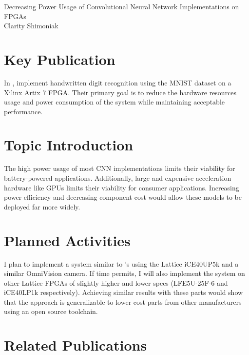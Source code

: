 \documentclass[12pt,letterpaper,english]{article}
\begin{document}
\begin{center}
	{\LARGE%
		Decreasing Power Usage of
		Convolutional Neural Network Implementations
		on FPGAs
	} \\
	\vspace{6pt}
	Clarity Shimoniak
	\vspace{-18pt}
\end{center}

\section*{Key Publication}

In \autocite{main}, \citeauthor{main} implement handwritten
digit recognition using the MNIST dataset on a Xilinx Artix 7 FPGA. Their
primary goal is to reduce the hardware resources usage and power consumption of
the system while maintaining acceptable performance.


\section*{Topic Introduction}

The high power usage of most CNN implementations limits their viability for
battery-powered applications. Additionally, large and expensive acceleration
hardware like GPUs limits their viability for consumer applications. Increasing
power efficiency and decreasing component cost would allow these models to be
deployed far more widely.


\section*{Planned Activities}

I plan to implement a system similar to \citeauthor*{main}'s using the Lattice
iCE40UP5k and a similar OmniVision camera. If time permits, I will also
implement the system on other Lattice FPGAs of slightly higher and lower specs
(LFE5U-25F-6 and iCE40LP1k respectively). Achieving similar results with these
parts would show that the approach is generalizable to lower-cost parts from
other manufacturers using an open source toolchain.


\section*{Related Publications}
\end{document}
